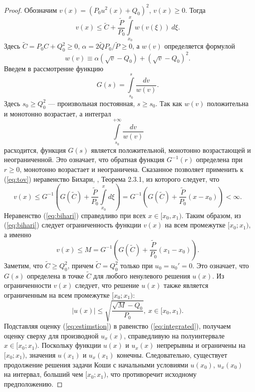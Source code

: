 \begin{proof}
%
Обозначим $v(x) = (P_0 u^2(x) + Q_0)^2$, $v(x) \ge 0$.
Тогда
%
\begin{equation}
v(x) \le \widetilde{C} +  \dfrac{\widetilde{P}}{P_0}\int \limits_{x_0}^x w(v(\xi))~d\xi. \label{eq:tov}
\end{equation}
%
Здесь $\widetilde{C} = P_0 C + Q_0^2 \ge 0$, $\alpha = {2\widetilde{Q} P_0}/{\widetilde{P}} \ge 0$, а $w(v)$ определяется формулой
%
\begin{equation}
w(v)\equiv\alpha (\sqrt{v} - Q_0) + (\sqrt{v} - Q_0)^2.
\label{eq:defw}
\end{equation}
%
Введем в рассмотрение функцию
%
\begin{equation}
G(s) = \int \limits_{s_0}^s \dfrac{dv}{w(v)}.
\label{eq:G}
\end{equation}
%
Здесь $s_0 \ge Q_0^2$ --- произвольная постоянная, $s \ge s_0$.
Так как $w(v)$ положительна и монотонно возрастает, а интеграл
%
\begin{equation}
\int \limits_{s_0}^{+\infty} \dfrac{dv}{w(v)}
\end{equation}
%
расходится, функция $G(s)$ является положительной, монотонно возрастающей и неограниченной.
Это означает, что обратная функция $G^{-1}(r)$ определена при $r \ge 0$, монотонно возрастает и неограничена.
Сказанное позволяет применить к (\ref{eq:tov}) неравенство Бихари, \cite{Pachpatte}, Теорема 2.3.1, из которого следует, что
%
\begin{equation}
v(x) \le G^{-1} \left( G(\widetilde{C}) +  \dfrac{\widetilde{P}}{P_0} {\int \limits_{x_0}^{x} d\xi} \right) = G^{-1} \left( G(\widetilde{C}) + \dfrac{\widetilde{P}}{P_0}(x - x_0) \right) < \infty.
\label{eq:bihari}
\end{equation}
%
Неравенство (\ref{eq:bihari}) справедливо при всех $x \in [x_0, x_1)$.
Таким образом, из (\ref{eq:bihari}) следует ограниченность функции $v(x)$ на всем промежутке $[x_0; x_1)$, а именно
%
\begin{equation}
v(x) \le M = G^{-1} \left( G(\widetilde{C}) + \dfrac{\widetilde{P}}{P_0}(x_1 - x_0) \right).
\end{equation}
%
Заметим, что $\widetilde{C} \ge Q_0^2$, причем $\widetilde{C} = Q_0^2$ только при $u_0 = u_0' = 0$.
Это означает, что $G(s)$ определена в точке $\widetilde{C}$ для любого ненулевого решения $u(x)$.
Из ограниченности $v(x)$ следует, что решение $u(x)$ также является ограниченным на всем промежутке $[x_0; x_1)$:
%
\begin{equation}
|u(x)| \le \sqrt{\dfrac{\sqrt{M} - Q_0}{P_0}},~x \in [x_0, x_1).
\label{eq:estimstion}
\end{equation}
%
Подставляя оценку (\ref{eq:estimstion}) в равенство (\ref{eq:integrated}), получаем оценку сверху для производной $u_x(x)$, справедливую на полуинтервале $x \in [x_0; x_1)$.
Поскольку функции $u(x)$ и $u_x(x)$ непрерывны и ограничены на $[x_0; x_1)$, значения $u(x_1)$ и $u_x(x_1)$ конечны.
Следовательно, существует продолжение решения задачи Коши с начальными условиями $u(x_0)$, $u_x(x_0)$ на интервал, больший чем $[x_0; x_1)$, что противоречит исходному предположению.


\end{proof}
